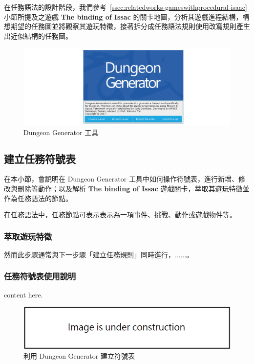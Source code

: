 在任務語法的設計階段，我們參考~\ref{ssec:relatedworks-gameswithprocedural-isaac} 小節所提及之遊戲 \textbf{The binding of Issac} 的關卡地圖，分析其遊戲進程結構，構想期望的任務圖並將觀察其遊玩特徵，接著拆分成任務語法規則使用改寫規則產生出近似結構的任務圖。

\begin{figure}[h]
  \begin{center}
    \includegraphics[width=1.0\textwidth]{figures/Dungeon_Generator_工具.png}
    \caption{Dungeon Generator 工具} 
    \label{fig:dungeon-generator}
  \end{center}
\end{figure}

\subsection{建立任務符號表}
\label{ssec:method-missiongrammars-alphabet}

在本小節，會說明在 Dungeon Generator 工具中如何操作符號表，進行新增、修改與刪除等動作；以及解析 \textbf{The binding of Issac} 遊戲關卡，萃取其遊玩特徵並作為任務語法的節點。

在任務語法中，任務節點可表示表示為一項事件、挑戰、動作或遊戲物件等。

\subsubsection{萃取遊玩特徵}
\label{sssec:method-missiongrammars-alphabet-extractpatterns}

然而此步驟通常與下一步驟「建立任務規則」同時進行，......。

\subsubsection{任務符號表使用說明}
\label{sssec:method-missiongrammars-alphabet-manual}

content here.

\begin{figure}[h]
  \begin{center}
    \includegraphics[width=1.0\textwidth]{figures/under_construction.png}
    \caption{利用 Dungeon Generator 建立符號表} 
    \label{fig:missiongrammars-alphabet-manual}
  \end{center}
\end{figure}

